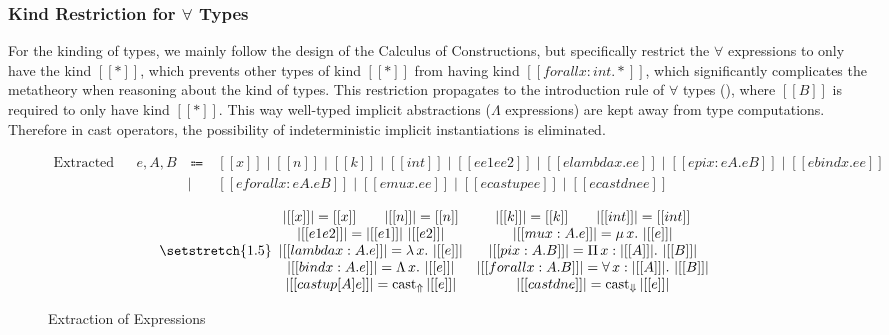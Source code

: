 \documentclass{llncs}
\newcommand{\extract}[1]{\lvert #1 \rvert}
\newcommand{\castup}[0]{\mathrm{cast}_\Uparrow}
\newcommand{\castdn}[0]{\mathrm{cast}_\Downarrow}
\begin{document}
\subsubsection{Kind Restriction for $\forall$ Types}
\label{sec:kind-restriction}

For the kinding of types, we mainly follow the design of the Calculus of
Constructions\cite{CoquandThierry1988Tcoc}, but specifically restrict the $\forall$
expressions to only have the kind $[[*]]$, which prevents other types of kind
$[[*]]$ from having kind $[[forall x : int. *]]$, which significantly complicates
the metatheory when reasoning about the kind of types.
This restriction propagates to the introduction rule of $\forall$ types (),
where $[[B]]$ is required to only have kind $[[*]]$.
This way well-typed implicit abstractions ($\Lambda$ expressions) are kept away
from type computations. Therefore in cast operators,
the possibility of indeterministic implicit instantiations is eliminated.

\begin{figure}
    \centering
    \begin{equation*}
        \begin{array}{llcl}
            \text{Extracted Expressions} & e, A, B & ~ \Coloneqq ~ & [[x]] \mid [[n]] \mid [[k]] \mid [[int]] \mid [[ee1 ee2]] \mid [[elambda x. ee]] \mid [[epi x : eA. eB]] \mid [[ebind x. ee]] \\
            & & \mid & [[eforall x : eA. eB]] \mid [[emu x. ee]] \mid [[ecastup ee]] \mid [[ecastdn ee]]
        \end{array}
    \end{equation*}

    \begin{equation*}
    {\setstretch{1.5}
    \begin{array}{cc}
        \extract{[[x]]} = [[x]] \qquad
        \extract{[[n]]} = [[n]] &
        \extract{[[k]]} = [[k]] \qquad
        \extract{[[int]]} = [[int]] \\
        \extract{[[e1 e2]]} = \extract{[[e1]]} ~ \extract{[[e2]]} &
        \extract{[[mu x : A. e]]} = \mu \, x. ~ \extract{[[e]]} \\
        \extract{[[lambda x : A. e]]} = \lambda \, x. ~ \extract{[[e]]} &
        \extract{[[pi x : A. B]]} = \Pi \, x : \extract{[[A]]}. ~ \extract{[[B]]} \\
        \extract{[[bind x : A. e]]} = \Lambda \, x. ~ \extract{[[e]]} &
        \extract{[[forall x : A. B]]} = \forall \, x : \extract{[[A]]}. ~ \extract{[[B]]} \\
        \extract{[[castup [A] e]]} = \castup \, \extract{[[e]]} &
        \extract{[[castdn e]]} = \castdn \, \extract{[[e]]}
    \end{array}
    }
    \end{equation*}

    \caption{Extraction of Expressions}
    \label{fig:extraction}
\end{figure}
\end{document}
